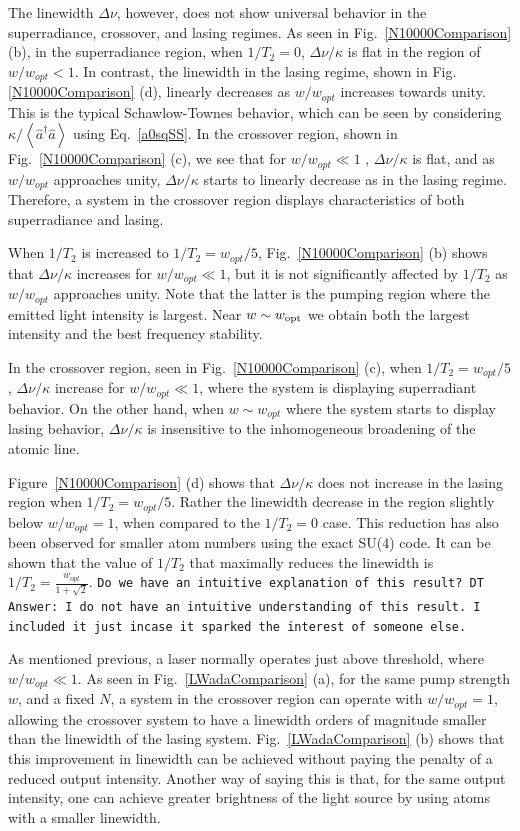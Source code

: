 \documentclass[aps,
twocolumn,
showpacs,
superscriptaddress,groupedaddress]{revtex4}
\newcommand{\dmcomment}[1]{{\tt #1}}
\begin{document}
The linewidth $\Delta \nu$, however, does not show universal behavior in
the superradiance, crossover, and lasing regimes. As seen in
Fig.~\ref{N10000Comparison} (b), in the superradiance region, when
$1/T_2=0$, $\Delta \nu / \kappa$ is flat in the region of $w/w_{opt}<1$.
In contrast, the linewidth in the lasing regime, shown in
Fig.\ref{N10000Comparison} (d), linearly decreases as $w/w_{opt}$
increases towards unity. This is the typical Schawlow-Townes behavior,
which can be seen by considering
$\kappa/\left<\hat{a}^{\dagger}\hat{a}\right>$ using Eq.~\ref{a0sqSS}.
In the crossover region, shown in Fig.~\ref{N10000Comparison} (c), we
see that for $w/w_{opt}\ll 1$ , $\Delta \nu/\kappa$ is flat, and as
$w/w_{opt}$ approaches unity, $\Delta \nu/\kappa$ starts to linearly
decrease as in the lasing regime. Therefore, a system in the crossover
region displays characteristics of both superradiance and lasing. 

When $1/T_2$ is increased to $1/T_2=w_{opt}/5$,
Fig.~\ref{N10000Comparison} (b) shows that $\Delta \nu/\kappa$ increases
for $w/w_{opt}\ll 1$, but it is not significantly affected by $1/T_2$ as
$w/w_{opt}$ approaches unity.  Note that the latter is the pumping
region where the emitted light intensity is largest.  Near $w\sim w_{\rm
opt}$ we obtain both the largest intensity and the best frequency
stability.

In the crossover region, seen in Fig.~\ref{N10000Comparison} (c), when
$1/T_2=w_{opt}/5$, $\Delta \nu/\kappa$ increase for $w/w_{opt}\ll 1$,
where the system is displaying superradiant behavior.  On the other
hand, when $w \sim w_{opt}$ where the
system starts to display lasing behavior, $\Delta\nu/\kappa$ is
insensitive to the inhomogeneous broadening of the atomic line.

Figure~\ref{N10000Comparison} (d) shows that $\Delta \nu/\kappa$ does
not increase in the lasing region when $1/T_2=w_{opt}/5$.  Rather the
linewidth decrease in the region slightly below $w/w_{opt}=1$, when
compared to the $1/T_2=0$ case. This reduction has also been observed
for smaller atom numbers using the exact SU(4) code. It can be shown
that the value of $1/T_2$ that maximally reduces the linewidth is
$1/T_2=\frac{w_{opt}}{1+\sqrt{2}}$.
\dmcomment{Do we have an intuitive explanation of this result? DT Answer: I do not have an intuitive understanding of this result. I included it just incase it sparked the interest of someone else.}

As mentioned previous, a laser normally operates just above threshold,
where $w/w_{opt} \ll 1$. As seen in Fig.~\ref{LWadaComparison} (a), for
the same pump strength $w$, and a fixed $N$, a system in the crossover
region can operate with $w/w_{opt} = 1$, allowing the crossover system
to have a linewidth orders of magnitude smaller than the linewidth of
the lasing system.  Fig.~\ref{LWadaComparison} (b) shows that this
improvement in linewidth can be achieved without paying the penalty of a
reduced output intensity.  Another way of saying this is that, for the
same output intensity, one can achieve greater brightness of the light
source by using atoms with a smaller linewidth.
\end{document}
